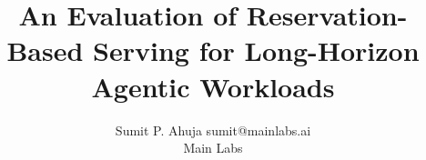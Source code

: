 %

\usepackage[utf8]{inputenc}
\usepackage{amsmath}
\usepackage{booktabs}   %
\usepackage{graphicx}   %
\usepackage{longtable}  %

\usepackage{hyperref}
\usepackage{url}
\hypersetup{colorlinks=true, linkcolor=black, citecolor=black, urlcolor=blue}

\ifanon
  \newcommand{\ArtifactRepoURL}{Supplementary material accompanying this submission}
\else
  \newcommand{\ArtifactRepoURL}{\url{https://github.com/Sup3rn0vaN0w/mainlabs-reservation-discipline}}
\fi

\title{An Evaluation of Reservation-Based Serving for Long-Horizon Agentic
Workloads}

\author{\name Sumit P. Ahuja \email sumit@mainlabs.ai \\
        \addr Main Labs}

\def\month{MM}
\def\year{YYYY}
\def\openreview{\url{https://openreview.net/forum?id=XXXX}}
